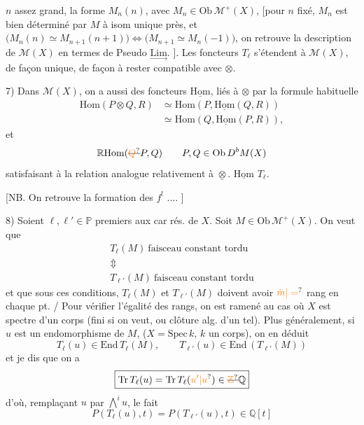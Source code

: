$n$ assez grand,  la forme %
$M_n(n)$, avec $M_n\in\mathrm{Ob}\,\mathcal M^+(X)$, [pour $n$ fixé, %
$M_n$ est bien déterminé par $M$ à isom unique %
près, et $\bigl(M_n(n)\simeq M_{n+1}(n+1)\bigr)\Leftrightarrow\bigl(M_{n+1}\simeq M_n(-1)\bigr)$, %
on retrouve la description de $\mathcal M(X)$ en %
termes de Pseudo $\underset{\longrightarrow}{\mathrm{Lim}}$. ]. Les foncteurs %
$T_\ell$ s'étendent à $\mathcal M(X)$, de façon  unique, de façon %
à rester compatible avec $\otimes$. %

7) Dans $\mathcal M(X)$, on a aussi des foncteurs %
$\underline{\mathrm{Hom}}$, liés à $\otimes$ par la formule %
habituelle %
\[
\begin{aligned}
\mathrm{Hom}(P\otimes Q,R)&\simeq\mathrm{Hom}(P,\underline{\mathrm{Hom}}(Q,R))\\ %
&\simeq\mathrm{Hom}(Q,\underline{\mathrm{Hom}}(P,R)), %
\end{aligned}
\]
et   %
\[
\mathbb R\mathrm{Hom}(\deleted{\unsure{Q}}P,Q)\qquad P,Q\in\mathrm{Ob}\,D^bM(X) %
\]
satisfaisant à la relation analogue %
relativement à $\underline{\otimes}$.  %
$\underline{\mathrm{Hom}}$   $T_\ell$. %

 [NB. On retrouve la formation %
des $f^!$ .... ] %

8) Soient $\ell,\ell'\in\mathbb P$ premiers aux car rés. %
de $X$. Soit $M\in\mathrm{Ob}\,\mathcal M^+(X)$. On veut %
que %
\[
\begin{gathered}
T_\ell(M)\ \text{faisceau constant tordu}\\ %
\Updownarrow\\ %
T_{\ell'}(M)\ \text{faisceau constant tordu} %
\end{gathered}
\]
et que sous ces conditions, $T_\ell(M)$ et %
$T_{\ell'}(M)$ doivent avoir $\unsure{\bar m|=}$ rang en chaque %
pt. / Pour vérifier l'égalité des rangs, on %
est ramené au cas où $X$ est  spectre d'un %
corps (fini si on veut,  ou clôture alg. %
d'un tel). Plus généralement, si %
$u$ est un endomorphisme de $M$,  %
($X=\mathrm{Spec}\,k$, $k$ un corps), on en déduit %
\[
T_\ell(u)\in\mathrm{End}\,T_\ell(M),\qquad T_{\ell'}(u)\in\mathrm{End}\,(T_{\ell'}(M)) %
\]
et je dis que on a %
\[
\boxed{\mathrm{Tr}\,T_\ell(u)=\mathrm{Tr}\,T_\ell(\unsure{u'|u})\in\deleted{\unsure{\mathbb Z}}\mathbb Q} %
\]
d'où, remplaçant $u$ par $\bigwedge^i u$, le fait %
\[
\boxed{P(T_\ell(u),t)=P(T_{\ell'}(u),t)\in\mathbb Q[t]} %
\]

